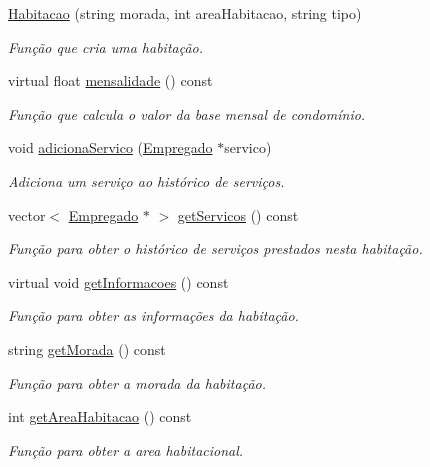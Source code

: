 \begin{DoxyCompactItemize}
\item 
\hyperlink{class_habitacao_af0994a78f4f97e38f70c350c81bceca8}{Habitacao} (string morada, int area\+Habitacao, string tipo)
\begin{DoxyCompactList}\small\item\em Função que cria uma habitação. \end{DoxyCompactList}\item 
virtual float \hyperlink{class_habitacao_a479d2307661c87b05242b86ba849fb6e}{mensalidade} () const 
\begin{DoxyCompactList}\small\item\em Função que calcula o valor da base mensal de condomínio. \end{DoxyCompactList}\item 
void \hyperlink{class_habitacao_a2a8c7343f36b0d9415aef14b09bca511}{adiciona\+Servico} (\hyperlink{class_empregado}{Empregado} $\ast$servico)
\begin{DoxyCompactList}\small\item\em Adiciona um serviço ao histórico de serviços. \end{DoxyCompactList}\item 
vector$<$ \hyperlink{class_empregado}{Empregado} $\ast$ $>$ \hyperlink{class_habitacao_ae157cbc24ee34cd97c48eb6c114804e9}{get\+Servicos} () const 
\begin{DoxyCompactList}\small\item\em Função para obter o histórico de serviços prestados nesta habitação. \end{DoxyCompactList}\item 
virtual void \hyperlink{class_habitacao_a87cf4e8f900eb5d28bf9178f187f83af}{get\+Informacoes} () const 
\begin{DoxyCompactList}\small\item\em Função para obter as informações da habitação. \end{DoxyCompactList}\item 
string \hyperlink{class_habitacao_a17ef78eef7746f92bd2814893bfafbab}{get\+Morada} () const 
\begin{DoxyCompactList}\small\item\em Função para obter a morada da habitação. \end{DoxyCompactList}\item 
int \hyperlink{class_habitacao_a8b8dc61b41f3bda37f3e517fe63f877a}{get\+Area\+Habitacao} () const 
\begin{DoxyCompactList}\small\item\em Função para obter a area habitacional. \end{DoxyCompactList}\item 

\end{DoxyCompactItemize}
